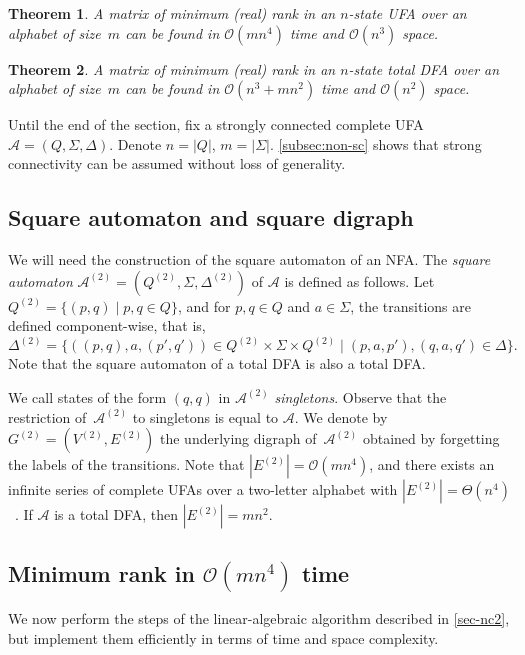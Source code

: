 \documentclass[11pt,a4paper]{amsart}
\newcommand{\OO}{\mathcal{O}}
\newcommand{\Aa}{\mathcal{A}}
\theoremstyle{plain}
\newtheorem{thm}{Theorem}[section]
\theoremstyle{definition}
\theoremstyle{defC}
\theoremstyle{thmC}
\theoremstyle{plain}
\numberwithin{equation}{section}
\begin{document}
\begin{thm}\label{thm:finding-matrix}
 A matrix of minimum (real) rank in an $n$-state UFA over an alphabet of size~$m$ can be found in  $\OO(mn^4)$ time and $\OO(n^3)$ space. 
\end{thm}


\begin{thm}\label{thm:main-dfas}
    A matrix of minimum (real) rank in an $n$-state total DFA over an alphabet of size~$m$ can be found in $\OO(n^3 + mn^2)$ time and $\OO(n^2)$ space.
\end{thm}

\noindent
Until the end of the section, fix a strongly connected complete UFA $\Aa = (Q, \Sigma, \Delta)$. Denote $n = |Q|$, $m = |\Sigma|$. \autoref{subsec:non-sc} shows that strong connectivity can be assumed without loss of generality.

\subsection{Square automaton and square digraph}\label{subsec:square-aut}

We will need the construction of the square automaton of an NFA. The \emph{square automaton} 
$\Aa^{(2)} = (Q^{(2)}, \Sigma, \Delta^{(2)})$ of $\Aa$ is defined as follows. Let $Q^{(2)} = \{(p, q) \mid p, q \in Q\}$, and for $p, q \in Q$ and $a \in \Sigma$, the transitions are defined component-wise, that is, 
\[\Delta^{(2)} = \{ ((p, q), a, (p', q')) \in Q^{(2)} \times \Sigma \times Q^{(2)} \mid (p, a, p'), (q,a,q') \in \Delta\}.\]
Note that the square automaton of a total DFA is also a total DFA. 


We call states of the form $(q, q)$ in $\Aa^{(2)}$ \emph{singletons}. Observe that the restriction of~$\Aa^{(2)}$ to singletons is equal to $\Aa$.
We denote by $G^{(2)} = (V^{(2)}, E^{(2)})$ the underlying digraph of~$\Aa^{(2)}$ obtained by forgetting the labels of the transitions. Note that $|E^{(2)}| = \OO(mn^4)$, and there exists an infinite series of complete UFAs over a two-letter alphabet with $|E^{(2)}| = \Theta(n^4)$~\cite[Appendix A]{Kiefer2019Arxiv}. If $\Aa$ is a total DFA, then $|E^{(2)}| = mn^2$.


\subsection{Minimum rank in \texorpdfstring{$\OO(mn^4)$}{O(n4)} time}\label{subsec:linalg-time}

We now perform the steps of the linear-algebraic algorithm described in \autoref{sec-nc2}, but implement them efficiently in terms of time and space complexity.
\end{document}
